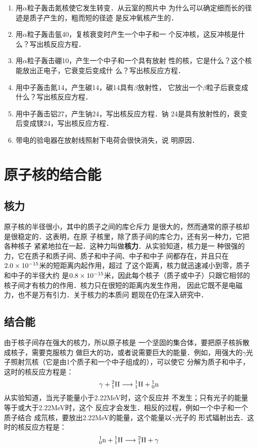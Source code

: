 \begin{enumerate}
    \item 用$\alpha$粒子轰击氮核使它发生转变．从云室的照片中
    为什么可以确定细而长的径迹是质子产生的，粗而短的径迹
    是反冲氧核产生的．
    \item 用$\alpha$粒子轰击氩40，复核衰变时产生一个中子和一
    个反冲核，这反冲核是什么？写出核反应方程．
    \item 用$\alpha$粒子轰击硼10，产生一个中子和一个具有放射
    性的核，它是什么？这个核能放出正电子，它衰变后变成什
    么？写出核反应方程．
    \item 用中子轰击氮14，产生碳14，碳14具有$\beta$放射性，
    它放出一个$\beta$粒子后衰变成什么？写出核反应方程．
    \item 用中子轰击铝27，产生钠24，写出核反应方程．钠
    24是具有放射性的，衰变后变成镁24，写出核反应方程．
    \item 带电的验电器在放射线照射下电荷会很快消失，说
    明原因．
\end{enumerate}


\section{原子核的结合能}
\subsection{核力} 

原子核的半径很小，其中的质子之间的库仑斥力
是很大的，然而通常的原子核却是很稳定的．这表明，在原
子核里，除了质子间的库仑力，还有另一种力，它把各种核子
紧紧地拉在一起．这种力叫做\textbf{核力}．从实验知道，核力是一
种很强的力，它在质子和质子间、质子和中子间、中子和中子
间都存在，并且只在$2.0\x10^{-15}$米的短距离内起作用，超过
了这个距离，核力就迅速减小到零，质子和中子的半径大约
是$0.8\x10^{-15}$米，因此每个核子（质子或中子）只跟它相邻的
核子间才有核力的作用．核力只在很短的距离内发生作用，
因此它既不是电磁力，也不是万有引力．关于核力的本质问
题现在仍在深入研究中．

\subsection{结合能}

由于核子间存在强大的核力，所以原子核是
一个坚固的集合体，要把原子核拆散成核子，需要克服核力
做巨大的功，或者说需要巨大的能量．例如，用强大的$\gamma$光
子照射氘核（它是由1个质子和一个中子组成的），可以使它
分解为质子和中子，这时的核反应方程是：
\[\gamma +\atom{H}{2}{1}\longrightarrow \atom{H}{1}{1}+\atom{n}{1}{0} \]
从实验知道，当光子能量小于2.22MeV时，这个反应并
不发生；只有光子的能量等于或大于2.22MeV时，这个
反应才会发生．相反的过程，例如一个中子和一个质子结合
成氘核，要放出2.22MeV的能量，这个能量以$\gamma$光子的
形式辐射出去．这时的核反应方程是：
\[\atom{n}{1}{0}+ \atom{H}{1}{1}\longrightarrow \atom{H}{2}{1} +\gamma  \]

